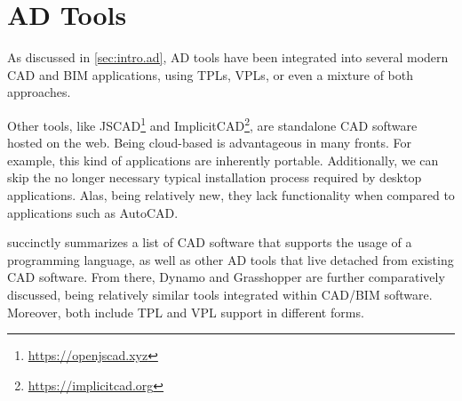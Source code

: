 \section{\acl{AD} Tools}%
\label{sec:related.ad}

As discussed in \cref{sec:intro.ad}, \ac{AD} tools have been integrated into
several modern \ac{CAD} and \ac{BIM} applications, using \acp{TPL}, \acp{VPL},
or even a mixture of both approaches.

Other tools, like JSCAD\footnote{\url{https://openjscad.xyz}} and
ImplicitCAD\footnote{\url{https://implicitcad.org}}, are standalone \ac{CAD}
software hosted on the web.  Being cloud-based is advantageous in many fronts.
For example, this kind of applications are inherently portable.  Additionally,
we can skip the no longer necessary typical installation process required by
desktop applications.  Alas, being relatively new, they lack functionality when
compared to applications such as AutoCAD\@.

 succinctly summarizes a list of \ac{CAD} software
that supports the usage of a programming language, as well as other \ac{AD}
tools that live detached from existing \ac{CAD} software.  From there, Dynamo
and Grasshopper are further comparatively discussed, being relatively similar
tools integrated within \acs{CAD}/\acs{BIM} software.  Moreover, both include
\ac{TPL} and \ac{VPL} support in different forms.

